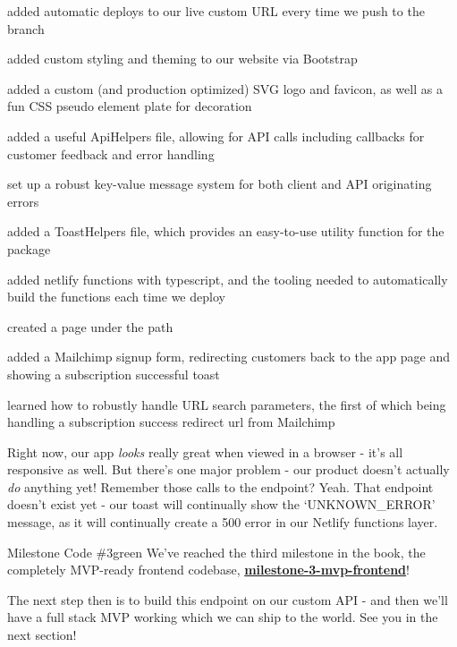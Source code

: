 \documentclass[a4paper,headinclude=on,footinclude=on,12pt,oneside]{scrbook}
\newcommand{\link}[2]{\textbf{\textcolor{monokaiPink}{\href{#2}{#1}}}}
\begin{document}
\begin{arrows}
\item added automatic deploys to our live custom URL every time we push to the  branch
\item added custom styling and theming to our website via Bootstrap
\item added a custom (and production optimized) SVG logo and favicon, as well as a fun CSS pseudo element plate for decoration
\item added a useful ApiHelpers file, allowing for API calls including callbacks for customer feedback and error handling
\item set up a robust key-value message system for both client and API originating errors
\item added a ToastHelpers file, which provides an easy-to-use utility function for the  package
\item added netlify functions with typescript, and the tooling needed to automatically build the functions each time we deploy
\item created a page under the  path
\item added a Mailchimp signup form, redirecting customers back to the app page and showing a subscription successful toast
\item learned how to robustly handle URL search parameters, the first of which being handling a subscription success redirect url from Mailchimp
\end{arrows}

Right now, our app \textit{looks} really great when viewed in a browser - it's all responsive as well. But there's one major problem - our product doesn't actually \textit{do} anything yet! \joy Remember those calls to the  endpoint? Yeah. That endpoint doesn't exist yet - our toast will continually show the `UNKNOWN\_ERROR' message, as it will continually create a 500 error in our Netlify functions layer.

\begin{highlightBox}{Milestone Code \#3}{green}{\greenCheck}
We've reached the third milestone in the book, the completely MVP-ready frontend codebase, \link{milestone-3-mvp-frontend}{https://github.com/Full-Stack-SaaS-Product-Cookbook/milestone-3-mvp-frontend}!
\end{highlightBox}

The next step then is to build this  endpoint on our custom API - and then we'll have a full stack MVP working which we can ship to the world. See you in the next section!
\end{document}
